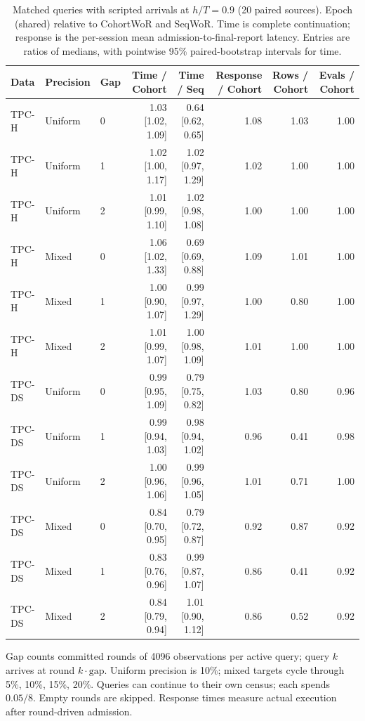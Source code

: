 \begin{table}[t]
\centering
\caption{Matched queries with scripted arrivals at $h/T=0.9$ (20 paired sources). Epoch (shared) relative to CohortWoR and SeqWoR. Time is complete continuation; response is the per-session mean admission-to-final-report latency. Entries are ratios of medians, with pointwise 95\% paired-bootstrap intervals for time.}
\label{tab:arrivals}
\begingroup
\small
\setlength{\tabcolsep}{5pt}
\renewcommand{\arraystretch}{1.10}
\begin{tabular*}{\textwidth}{@{\extracolsep{\fill}}lllrrrrr@{}}
\toprule
\textbf{Data} & \textbf{Precision} & \textbf{Gap} & \textbf{Time / Cohort} & \textbf{Time / Seq} & \textbf{Response / Cohort} & \textbf{Rows / Cohort} & \textbf{Evals / Cohort} \\
\midrule
TPC-H & Uniform & 0 & 1.03 [1.02, 1.09] & 0.64 [0.62, 0.65] & 1.08 & 1.03 & 1.00 \\
TPC-H & Uniform & 1 & 1.02 [1.00, 1.17] & 1.02 [0.97, 1.29] & 1.02 & 1.00 & 1.00 \\
TPC-H & Uniform & 2 & 1.01 [0.99, 1.10] & 1.02 [0.98, 1.08] & 1.00 & 1.00 & 1.00 \\
\addlinespace[2pt]
TPC-H & Mixed & 0 & 1.06 [1.02, 1.33] & 0.69 [0.69, 0.88] & 1.09 & 1.01 & 1.00 \\
TPC-H & Mixed & 1 & 1.00 [0.90, 1.07] & 0.99 [0.97, 1.29] & 1.00 & 0.80 & 1.00 \\
TPC-H & Mixed & 2 & 1.01 [0.99, 1.07] & 1.00 [0.98, 1.09] & 1.01 & 1.00 & 1.00 \\
\addlinespace[2pt]
TPC-DS & Uniform & 0 & 0.99 [0.95, 1.09] & 0.79 [0.75, 0.82] & 1.03 & 0.80 & 0.96 \\
TPC-DS & Uniform & 1 & 0.99 [0.94, 1.03] & 0.98 [0.94, 1.02] & 0.96 & 0.41 & 0.98 \\
TPC-DS & Uniform & 2 & 1.00 [0.96, 1.06] & 0.99 [0.96, 1.05] & 1.01 & 0.71 & 1.00 \\
\addlinespace[2pt]
TPC-DS & Mixed & 0 & 0.84 [0.70, 0.95] & 0.79 [0.72, 0.87] & 0.92 & 0.87 & 0.92 \\
TPC-DS & Mixed & 1 & 0.83 [0.76, 0.96] & 0.99 [0.87, 1.07] & 0.86 & 0.41 & 0.92 \\
TPC-DS & Mixed & 2 & 0.84 [0.79, 0.94] & 1.01 [0.90, 1.12] & 0.86 & 0.52 & 0.92 \\
\bottomrule
\end{tabular*}
\par\smallskip
\footnotesize\raggedright
Gap counts committed rounds of 4096 observations per active query; query $k$ arrives at round $k\cdot\mathrm{gap}$. Uniform precision is 10\%; mixed targets cycle through 5\%, 10\%, 15\%, 20\%. Queries can continue to their own census; each spends $0.05/8$. Empty rounds are skipped. Response times measure actual execution after round-driven admission.
\par\endgroup
\end{table}
